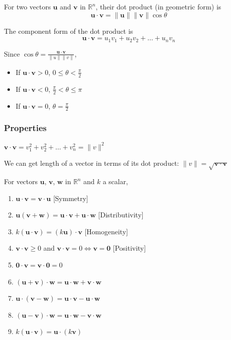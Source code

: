 \documentclass[../linear-algebra.tex]{subfiles}
\begin{document}
For two vectors $\mathbf{u}$ and $\mathbf{v}$ in $\mathbb{R}^n$, their dot product (in geometric form) is
\[\mathbf{u} \cdot \mathbf{v} = \|\mathbf{u}\|\|\mathbf{v}\|\cos\theta\]

\noindent The component form of the dot product is
\[\mathbf{u} \cdot \mathbf{v} = u_1v_1 + u_2v_2 + \ldots + u_nv_n\]

\noindent Since $\cos\theta = \frac{\mathbf{u} \cdot \mathbf{v}}{\|u\|\|v\|}$,
\begin{itemize}
    \item If $\mathbf{u} \cdot \mathbf{v} > 0$, $0 \leq \theta < \frac{\pi}{2}$
    \item If $\mathbf{u} \cdot \mathbf{v} < 0$, $\frac{\pi}{2} < \theta \leq \pi$
    \item If $\mathbf{u} \cdot \mathbf{v} = 0$, $\theta = \frac{\pi}{2}$
\end{itemize}

\subsubsection{Properties}

$\mathbf{v} \cdot \mathbf{v} = v_1^2 + v_2^2 + \ldots + v_n^2 = \|v\|^2$

\medskip

\noindent We can get length of a vector in terms of its dot product: $\|v\| = \sqrt{\mathbf{v}\cdot\mathbf{v}}$

\medskip

\noindent For vectors $\mathbf{u}$, $\mathbf{v}$, $\mathbf{w}$ in $\mathbb{R}^n$ and $k$ a scalar,
\begin{enumerate}
    \item $\mathbf{u} \cdot \mathbf{v} = \mathbf{v} \cdot \mathbf{u}$ [Symmetry]
    \item $\mathbf{u}(\mathbf{v} + \mathbf{w}) = \mathbf{u} \cdot \mathbf{v} + \mathbf{u} \cdot \mathbf{w}$ [Distributivity]
    \item $k(\mathbf{u} \cdot \mathbf{v}) = (k\mathbf{u})\cdot\mathbf{v}$ [Homogeneity]
    \item $\mathbf{v}\cdot\mathbf{v} \geq 0$ and $\mathbf{v}\cdot\mathbf{v} = 0 \iff \mathbf{v} = \mathbf{0}$ [Positivity]
    \item $\mathbf{0}\cdot\mathbf{v} = \mathbf{v}\cdot\mathbf{0} = 0$
    \item $(\mathbf{u} + \mathbf{v})\cdot\mathbf{w} = \mathbf{u}\cdot\mathbf{w} + \mathbf{v}\cdot\mathbf{w}$
    \item $\mathbf{u}\cdot(\mathbf{v} - \mathbf{w}) = \mathbf{u}\cdot\mathbf{v} - \mathbf{u}\cdot\mathbf{w}$
    \item $(\mathbf{u} - \mathbf{v}) \cdot \mathbf{w} = \mathbf{u} \cdot \mathbf{w} - \mathbf{v} \cdot \mathbf{w}$
    \item $k(\mathbf{u} \cdot \mathbf{v}) = \mathbf{u} \cdot (k\mathbf{v})$
\end{enumerate}
\end{document}
